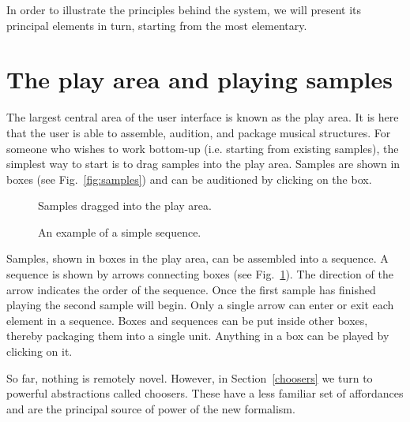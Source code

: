\documentclass[runningheads,a4paper]{llncs}
\begin{document}
In order to illustrate the principles behind the system, we will present its principal elements in turn, starting from the most elementary.


\section{The play area and playing samples}\label{play-area}

The largest central area of the user interface is known as the play area. It is here that the user is able to assemble, audition, and package musical structures. For someone who wishes to work bottom-up (i.e. starting from existing samples), the simplest way to start is to drag samples into the play area. Samples are shown in boxes (see Fig.~\ref{fig:samples}) and can be auditioned by clicking on the box.


\begin{figure}
	\begin{floatrow}
			{\caption{Samples dragged into the play area.}\label{fig:samples}}
			{\caption{An example of a simple sequence.}\label{fig:simple-sequence}}
	\end{floatrow}
\end{figure}


Samples, shown in boxes in the play area, can be assembled into a sequence. A sequence is shown by arrows connecting boxes (see Fig.~\ref{fig:simple-sequence}). The direction of the arrow indicates the order of the sequence. Once the first sample has finished playing the second sample will begin. Only a single arrow can enter or exit each element in a sequence. Boxes and sequences can be put inside other boxes, thereby packaging them into a single unit. Anything in a box can be played by clicking on it.
 
So far, nothing is remotely novel.  However, in Section~\ref{choosers} we turn to powerful abstractions called choosers. These have a less familiar set of affordances and are the principal source of power of the new formalism.
\end{document}
